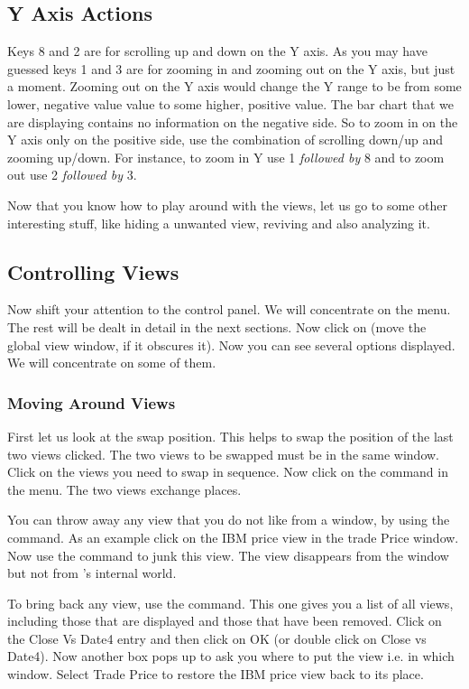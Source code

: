 \subsection{Y Axis Actions}

Keys 8 and 2 are for scrolling up and down on the Y axis. As you may
have guessed keys 1 and 3 are for zooming in and zooming out on the Y
axis, but just a moment. Zooming out on the Y axis would change the Y
range to be from some lower, negative value value to some higher,
positive value. The bar chart that we are displaying contains no
information on the negative side. So to zoom in on the Y axis only on
the positive side, use the combination of scrolling down/up and
zooming up/down. For instance, to zoom in Y use 1 {\em followed by} 8
and to zoom out use 2 {\em followed by} 3.

Now that you know how to play around with the views, let us go to some
other interesting stuff, like hiding a unwanted view, reviving and
also analyzing it.

\subsection{Controlling Views}

Now shift your attention to the control panel. We will concentrate on
the  menu. The rest will be dealt in detail in the next
sections. Now click on  (move the global view window, if it
obscures it). Now you can see several options displayed. We will
concentrate on some of them.

\subsubsection{Moving Around Views}

First let us look at the swap position. This helps to swap the
position of the last two views clicked. The two views to be swapped
must be in the same window. Click on the views you need to swap in
sequence. Now click on the  command in the
 menu. The two views exchange places.

You can throw away any view that you do not like from a window, by
using the  command. As an example click on
the IBM price view in the trade Price window. Now use the  command to junk this view. The view disappears from the
window but not from \Devise's internal world.

To bring back any view, use the 
command. This one gives you a list of all views, including those that
are displayed and those that have been removed. Click on the Close Vs
Date4 entry and then click on OK (or double click on Close vs Date4).
Now another box pops up to ask you where to put the view i.e. in which
window. Select Trade Price to restore the IBM price view back to its
place.


